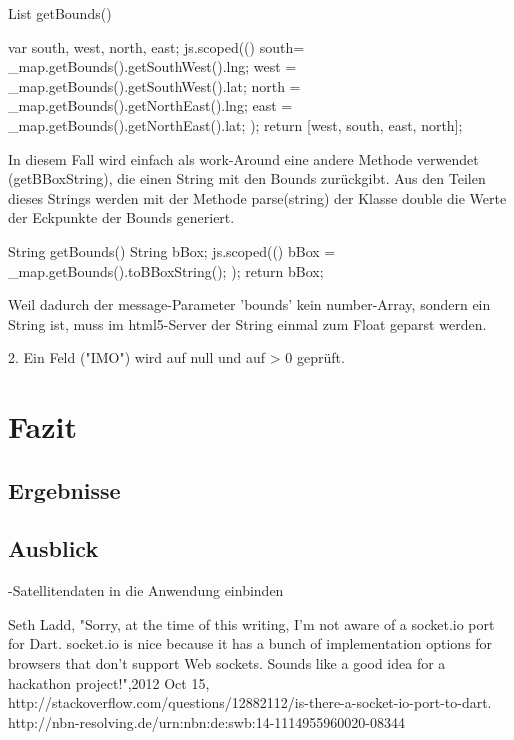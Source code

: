   List getBounds(){
    var south, west, north, east;
    js.scoped((){
    south= \_map.getBounds().getSouthWest().lng;
        west = \_map.getBounds().getSouthWest().lat;
        north = \_map.getBounds().getNorthEast().lng;
        east = \_map.getBounds().getNorthEast().lat;
 });
return [west, south, east, north];
    
In diesem Fall wird einfach als work-Around eine andere Methode verwendet (getBBoxString), die einen String mit den Bounds zurückgibt. Aus den Teilen dieses Strings werden mit der Methode parse(string) der Klasse double die Werte der Eckpunkte der Bounds generiert.

String getBounds(){
    String bBox;
    js.scoped((){
      bBox = \_map.getBounds().toBBoxString();
    });
    return bBox;
  }

 Weil dadurch der message-Parameter 'bounds' kein number-Array, sondern ein String ist, muss im html5-Server der String einmal zum Float geparst werden.



2. Ein Feld ("IMO") wird auf null und auf > 0 geprüft.


\chapter{Fazit}\label{c.Fazit}

 \section{Ergebnisse }

\section{Ausblick}
-Satellitendaten in die Anwendung einbinden


%
\begin{thebibliography}{999}
	 Seth Ladd, "Sorry, at the time of this writing, I'm not aware of a socket.io port for Dart. socket.io is nice because it has a bunch of implementation options for browsers that don't support Web sockets. Sounds like a good idea for a hackathon project!",2012 Oct 15,  http://stackoverflow.com/questions/12882112/is-there-a-socket-io-port-to-dart.
\bibitem{}
\bibitem{}http://nbn-resolving.de/urn:nbn:de:swb:14-1114955960020-08344


\end{thebibliography}

}
